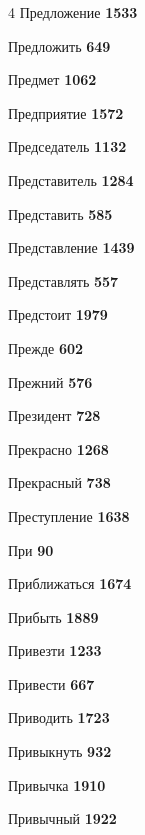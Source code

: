 \begin{multicols}{4}
\noindent Предложение \dotfill \textbf{\color{secondary} 1533}\par
\noindent Предложить \dotfill \textbf{\color{secondary} 649}\par
\noindent Предмет \dotfill \textbf{\color{secondary} 1062}\par
\noindent Предприятие \dotfill \textbf{\color{secondary} 1572}\par
\noindent Председатель \dotfill \textbf{\color{secondary} 1132}\par
\noindent Представитель \dotfill \textbf{\color{secondary} 1284}\par
\noindent Представить \dotfill \textbf{\color{secondary} 585}\par
\noindent Представление \dotfill \textbf{\color{secondary} 1439}\par
\noindent Представлять \dotfill \textbf{\color{secondary} 557}\par
\noindent Предстоит \dotfill \textbf{\color{secondary} 1979}\par
\noindent Прежде \dotfill \textbf{\color{secondary} 602}\par
\noindent Прежний \dotfill \textbf{\color{secondary} 576}\par
\noindent Президент \dotfill \textbf{\color{secondary} 728}\par
\noindent Прекрасно \dotfill \textbf{\color{secondary} 1268}\par
\noindent Прекрасный \dotfill \textbf{\color{secondary} 738}\par
\noindent Преступление \dotfill \textbf{\color{secondary} 1638}\par
\noindent При \dotfill \textbf{\color{secondary} 90}\par
\noindent Приближаться \dotfill \textbf{\color{secondary} 1674}\par
\noindent Прибыть \dotfill \textbf{\color{secondary} 1889}\par
\noindent Привезти \dotfill \textbf{\color{secondary} 1233}\par
\noindent Привести \dotfill \textbf{\color{secondary} 667}\par
\noindent Приводить \dotfill \textbf{\color{secondary} 1723}\par
\noindent Привыкнуть \dotfill \textbf{\color{secondary} 932}\par
\noindent Привычка \dotfill \textbf{\color{secondary} 1910}\par
\noindent Привычный \dotfill \textbf{\color{secondary} 1922}\par

\end{multicols}
